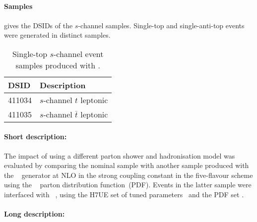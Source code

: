 \subsection[Powheg+Herwig7]{\POWHER[7]}
\label{subsubsec:schan_PH7}

\paragraph{Samples}

 gives the DSIDs of the \(s\)-channel \POWHER[7] samples.
Single-top and single-anti-top events were generated in distinct samples.

\begin{table}[htbp]
  \caption{Single-top \(s\)-channel event samples produced with \POWHER[7].}%
  \label{tab:schan_PH7}
  \centering
  \begin{tabular}{l l}
    \toprule
    DSID & Description \\
    \midrule
    411034 & \(s\)-channel \(t\) leptonic \\
    411035 & \(s\)-channel \(\bar{t}\) leptonic \\
    \bottomrule
  \end{tabular}
\end{table}

\paragraph{Short description:}

The impact of using a different parton shower and hadronisation model was evaluated by comparing the nominal sample
with another sample produced with the \POWHEGBOX[v2]~\cite{Alioli:2009je,Nason:2004rx,Frixione:2007vw,Alioli:2010xd}
generator at NLO in the strong coupling constant \alphas in the five-flavour scheme using the
\NNPDF[3.0nlo]~\cite{Ball:2014uwa} parton distribution function~(PDF).
Events in the latter sample were interfaced with \HERWIG[7.04]~\cite{Bahr:2008pv,Bellm:2015jjp}, using the H7UE set of
tuned parameters~\cite{Bellm:2015jjp} and the \MMHT[lo] PDF set \cite{Harland-Lang:2014zoa}.


\paragraph{Long description:}

